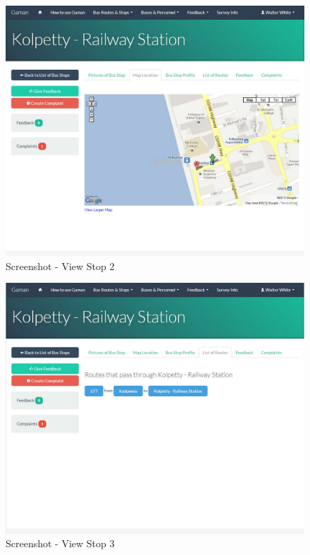 \begin {figure} [h!]
\centering
\includegraphics[scale=0.2]{viewStop2}
\caption [Screenshot - View Stop 2] {Screenshot - View Stop 2}
\label {image-viewStop2}
\end {figure}

\begin {figure} [h!]
\centering
\includegraphics[scale=0.2]{viewStop3}
\caption [Screenshot - View Stop 3] {Screenshot - View Stop 3}
\label {image-viewStop3}
\end {figure}


